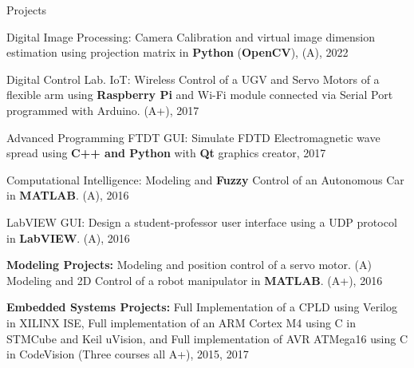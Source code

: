 \begin{cventries}
  \cventry
    {} %
    {Projects} %
    {} %
    {} %
    {
      \begin{cvitems} %
        \item{Digital Image Processing: Camera Calibration and virtual image dimension estimation using projection matrix in \textbf{Python} (\textbf{OpenCV}), (A), 2022}
            \item{Digital Control Lab. IoT: Wireless Control of a UGV and Servo Motors of a flexible arm using \textbf{Raspberry Pi} and Wi-Fi module connected via Serial Port programmed with Arduino. (A+), 2017}
            \item{Advanced Programming FTDT GUI: Simulate FDTD Electromagnetic wave spread using \textbf{C++ and Python} with \textbf{Qt} graphics creator, 2017}
            \item{Computational Intelligence: Modeling and \textbf{Fuzzy} Control of an Autonomous Car in \textbf{MATLAB}. (A), 2016}
            \item{LabVIEW GUI: Design a student-professor user interface using a UDP protocol in \textbf{LabVIEW}. (A), 2016}
            \item{\textbf{Modeling Projects:} Modeling and position control of a servo motor. (A)\\ Modeling and 2D Control of a robot manipulator in \textbf{MATLAB}. (A+), 2016}
            \item{\textbf{Embedded Systems Projects:} Full Implementation of a CPLD using Verilog in XILINX ISE, Full implementation of an ARM Cortex M4 using C in STMCube and Keil uVision, and Full implementation of  AVR ATMega16 using C in CodeVision (Three courses all A+), 2015, 2017}
      \end{cvitems}
    }
    

\end{cventries}
